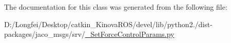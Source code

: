 The documentation for this class was generated from the following file\+:\begin{DoxyCompactItemize}
\item 
D\+:/\+Longfei/\+Desktop/catkin\+\_\+\+Kinova\+R\+O\+S/devel/lib/python2./dist-\/packages/jaco\+\_\+msgs/srv/\hyperlink{__SetForceControlParams_8py}{\+\_\+\+Set\+Force\+Control\+Params.\+py}\end{DoxyCompactItemize}
